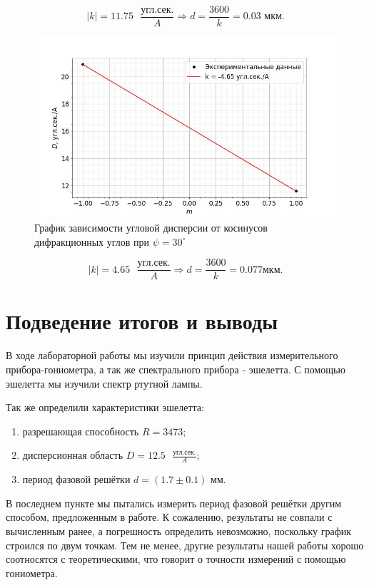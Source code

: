\documentclass[a4paper,12pt]{article} %
\begin{document}
\begin{enumerate}
    \[ |k| = 11.75\text{ }\frac{\text{угл.сек.}}{A} \Longrightarrow d = \frac{3600}{k} = 0.03\text{ мкм}. \]

\newpage

    \begin{figure}[h]
        \begin{center}
            \includegraphics[width=16cm]{image4.jpg}
        \end{center}
        \caption{График зависимости угловой дисперсии от косинусов дифракционных углов при $\psi=30^{\circ}$}
        \label{img6}
    \end{figure}

    \[ |k| = 4.65\text{ }\frac{\text{угл.сек.}}{A} \Longrightarrow d = \frac{3600}{k} = 0.077\text{мкм}. \]

\end{enumerate}

\section{Подведение итогов и выводы}

В ходе лабораторной работы мы изучили принцип действия измерительного прибора-гониометра, а так же спектрального прибора - эшелетта. С помощью эшелетта мы изучили спектр ртутной лампы. 

Так же определили характеристики эшелетта:

\begin{enumerate}
    \item разрешающая способность $R=3473$;
    \item дисперсионная область $D=12.5\text{ }\frac{\text{угл.сек.}}{A}$;
    \item период фазовой решётки $d=(1.7\pm0.1)\text{ мм}$.
\end{enumerate}

В последнем пункте мы пытались измерить период фазовой решётки другим способом, предложенным в работе. К сожалению, результаты не совпали с вычисленным ранее, а погрешность определить невозможно, поскольку график строился по двум точкам. Тем не менее, другие результаты нашей работы хорошо соотносятся с теоретическими, что говорит о точности измерений с помощью гониометра.

    
    
\end{document}

